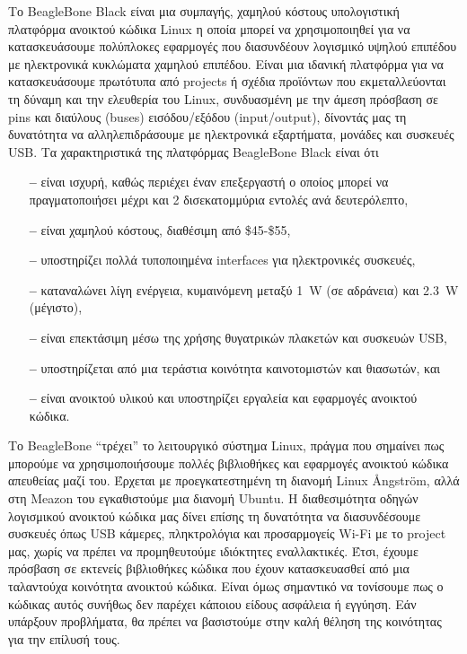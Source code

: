 \documentclass[12pt, a4paper, oneside]{report}
\begin{document}
Το BeagleBone Black είναι μια συμπαγής, χαμηλού κόστους υπολογιστική πλατφόρμα ανοικτού κώδικα Linux η οποία μπορεί να χρησιμοποιηθεί για να κατασκευάσουμε πολύπλοκες εφαρμογές που διασυνδέουν λογισμικό υψηλού επιπέδου με ηλεκτρονικά κυκλώματα χαμηλού επιπέδου. Είναι μια ιδανική πλατφόρμα για να κατασκευάσουμε πρωτότυπα από projects ή σχέδια προϊόντων που εκμεταλλεύονται τη δύναμη και την ελευθερία του Linux, συνδυασμένη με την άμεση πρόσβαση σε pins και διαύλους (buses) εισόδου\slash εξόδου (input\slash output), δίνοντάς μας τη δυνατότητα να αλληλεπιδράσουμε με ηλεκτρονικά εξαρτήματα, μονάδες και συσκευές USB. Τα χαρακτηριστικά της πλατφόρμας BeagleBone Black είναι ότι
\begin{itemize}
\item[\textbf{--}] είναι ισχυρή, καθώς περιέχει έναν επεξεργαστή ο οποίος μπορεί να πραγματοποιήσει μέχρι και 2 δισεκατομμύρια εντολές ανά δευτερόλεπτο,
\item[\textbf{--}] είναι χαμηλού κόστους, διαθέσιμη από \$45-\$55,
\item[\textbf{--}] υποστηρίζει πολλά τυποποιημένα interfaces για ηλεκτρονικές συσκευές,
\item[\textbf{--}] καταναλώνει λίγη ενέργεια, κυμαινόμενη μεταξύ 1~W (σε αδράνεια) και 2.3~W (μέγιστο),
\item[\textbf{--}] είναι επεκτάσιμη μέσω της χρήσης θυγατρικών πλακετών και συσκευών USB,
\item[\textbf{--}] υποστηρίζεται από μια τεράστια κοινότητα καινοτομιστών και θιασωτών, και 
\item[\textbf{--}] είναι ανοικτού υλικού και υποστηρίζει εργαλεία και εφαρμογές ανοικτού κώδικα.
\end{itemize}

Το BeagleBone ``τρέχει'' το λειτουργικό σύστημα Linux, πράγμα που σημαίνει πως μπορούμε να χρησιμοποιήσουμε πολλές βιβλιοθήκες και εφαρμογές ανοικτού κώδικα απευθείας μαζί του. Έρχεται με προεγκατεστημένη τη διανομή \textenglish{Linux \AA ngstr\"om}, αλλά στη Meazon του εγκαθιστούμε μια διανομή Ubuntu. Η διαθεσιμότητα οδηγών λογισμικού ανοικτού κώδικα μας δίνει επίσης τη δυνατότητα να διασυνδέσουμε συσκευές όπως USB κάμερες, πληκτρολόγια και προσαρμογείς Wi-Fi με το project μας, χωρίς να πρέπει να προμηθευτούμε ιδιόκτητες εναλλακτικές. Έτσι, έχουμε πρόσβαση σε εκτενείς βιβλιοθήκες κώδικα που έχουν κατασκευασθεί από μια ταλαντούχα κοινότητα ανοικτού κώδικα. Είναι όμως σημαντικό να τονίσουμε πως ο κώδικας αυτός συνήθως δεν παρέχει κάποιου είδους ασφάλεια ή εγγύηση. Εάν υπάρξουν προβλήματα, θα πρέπει να βασιστούμε στην καλή θέληση της κοινότητας για την επίλυσή τους.
\end{document}
